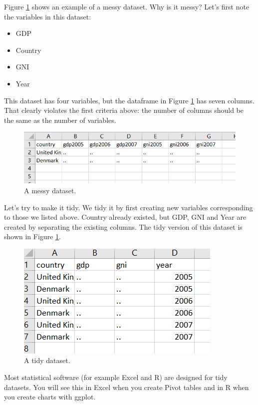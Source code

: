 \documentclass[]{book}
\providecommand{\tightlist}{%
  \setlength{\itemsep}{0pt}\setlength{\parskip}{0pt}}
\begin{document}
Figure \ref{fig:store4} shows an example of a messy dataset. Why is it messy? Let's first note the variables in this dataset:

\begin{itemize}
\tightlist
\item
  GDP
\item
  Country
\item
  GNI
\item
  Year
\end{itemize}

This dataset has four variables, but the dataframe in Figure \ref{fig:store4} has seven columns. That clearly violates the first criteria above: the number of columns should be the same as the number of variables.

\begin{figure}

{\centering \includegraphics[width=0.5\linewidth]{_resources/chapter_storing/messy} 

}

\caption{A messy dataset.}\label{fig:store4}
\end{figure}

Let's try to make it tidy. We tidy it by first creating new variables corresponding to those we listed above. Country already existed, but GDP, GNI and Year are created by separating the existing columns. The tidy version of this dataset is shown in Figure \ref{fig:store4}.

\begin{figure}

{\centering \includegraphics[width=0.5\linewidth]{_resources/chapter_storing/tidy} 

}

\caption{A tidy dataset.}\label{fig:store5}
\end{figure}

Most statistical software (for example Excel and R) are designed for tidy datasets. You will see this in Excel when you create Pivot tables and in R when you create charts with ggplot.
\end{document}
